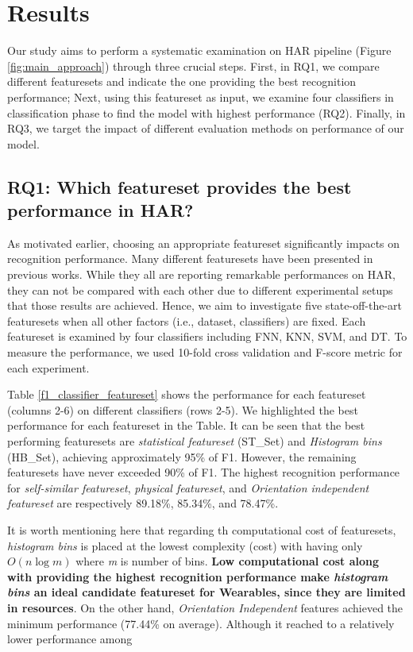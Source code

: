 \documentclass[journal,article,submit,moreauthors,pdftex]{Definitions/mdpi}
\begin{document}
\section{Results}
Our study aims to perform a systematic examination on HAR pipeline (Figure \ref{fig:main_approach}) through three crucial steps. First, in RQ1, we compare different featuresets and indicate the one providing the best recognition performance; Next, using this featureset as input, we examine four classifiers in classification phase to find the model with highest performance (RQ2). Finally, in RQ3,  we target the impact of different evaluation methods on performance of our model.

\subsection{RQ1: Which featureset provides the best performance in HAR?}

As motivated earlier, choosing an appropriate featureset significantly impacts on recognition performance. Many different featuresets have been presented in previous works. While they all are reporting remarkable performances on HAR, they can not be compared with each other due to different experimental setups that those results are achieved. Hence, we aim to investigate five state-off-the-art featuresets when all other factors (i.e., dataset, classifiers) are fixed. Each featureset is examined by four classifiers including FNN, KNN, SVM, and DT. To measure the performance, we used 10-fold cross validation and F-score metric for each experiment.

Table \ref{f1_classifier_featureset} shows the performance for each featureset (columns 2-6) on different classifiers (rows 2-5). We highlighted the best performance for each featureset in the Table. It can be seen that the best performing featuresets are \textit{statistical featureset} (ST\_Set) and \textit{Histogram bins} (HB\_Set), achieving approximately 95\% of F1. However, the remaining featuresets have never exceeded 90\% of F1. The highest recognition performance for \textit{self-similar featureset}, \textit{physical featureset}, and \textit{Orientation independent featureset} are respectively 89.18\%, 85.34\%, and 78.47\%.

It is worth mentioning here that regarding th computational cost of featuresets, \textit{histogram bins} is placed at the lowest complexity (cost) with having only $ O(n\log m) $ where \textit{m} is number of bins. \textbf{Low computational cost along with providing the highest recognition performance make \textit{histogram bins} an ideal candidate featureset for Wearables, since they are limited in resources}. On the other hand, \textit{Orientation Independent} features achieved the minimum performance (77.44\% on average). Although it reached to a relatively lower performance among 
\end{document}
